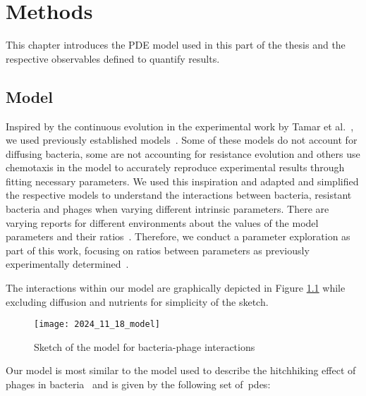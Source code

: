 \chapter{Methods}
\label{chap:phage_methods}

This chapter introduces the PDE model used in this part of the thesis and the respective observables defined to quantify results.

\section{Model}
Inspired by the continuous evolution in the experimental work by Tamar et al.~\cite{ShaerTamar2022}, we used previously established models~\cite{Ping2020, Wang2024, Smith2011, Yin1992}. Some of these models do not account for diffusing bacteria, some are not accounting for resistance evolution and others use chemotaxis in the model to accurately reproduce experimental results through fitting necessary parameters. We used this inspiration and adapted and simplified the respective models to understand the interactions between bacteria, resistant bacteria and phages when varying different intrinsic parameters.
There are varying reports for different environments about the values of the model parameters and their ratios~\cite{Eriksen2020, Ping2020}.
Therefore, we conduct a parameter exploration as part of this work, focusing on ratios between parameters as previously experimentally determined~\cite{Tavaddod2011, Moldovan2007, Payne2018}.

The interactions within our model are graphically depicted in Figure \ref{fig:model_sketch} while excluding diffusion and nutrients for simplicity of the sketch.

\begin{figure}
\centering
\texttt{[image: 2024\_11\_18\_model]}
\caption{Sketch of the model for bacteria-phage interactions}
\label{fig:model_sketch}
\end{figure}

Our model is most similar to the model used to describe the hitchhiking effect of phages in bacteria~\cite{Ping2020} and is given by the following set of~\gls{pde}s:

